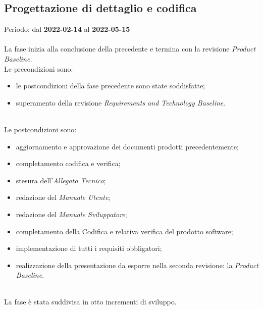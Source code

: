 \subsection{Progettazione di dettaglio e codifica}
Periodo: dal \textbf{2022-02-14} al \textbf{2022-05-15} \mbox{} \\ \mbox{} \\
La fase inizia alla conclusione della precedente e termina con la revisione \textit{Product Baseline.} \mbox{} \\
Le precondizioni sono:
\begin{itemize}
	\item le postcondizioni della fase precedente sono state soddisfatte;
 	\item superamento della revisione \textit{Requirements and Technology Baseline}.
\end{itemize} \mbox{} \\
Le postcondizioni sono:
\begin{itemize}
	\item aggiornamento e approvazione dei documenti prodotti precedentemente;
	\item completamento codifica e verifica;
	\item stesura dell'\textit{Allegato Tecnico};
	\item redazione del \textit{Manuale Utente};
 	\item redazione del \textit{Manuale Sviluppatore};
    \item completamento della Codifica e relativa verifica del prodotto software;
    \item implementazione di tutti i requisiti obbligatori;
	\item realizzazione della presentazione da esporre nella seconda revisione: la \textit{Product Baseline}\glo{}. 
\end{itemize} \mbox{} \\
La fase è stata suddivisa in otto incrementi di sviluppo.

